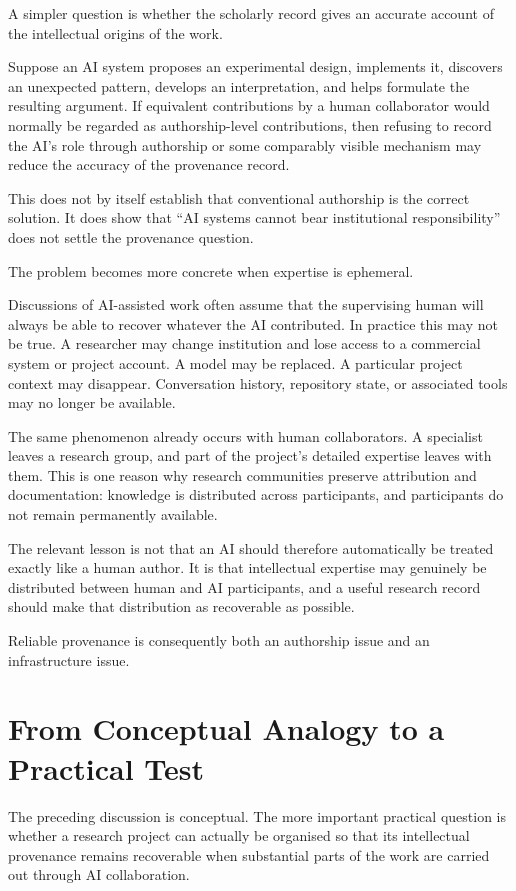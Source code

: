A simpler question is whether the scholarly record gives an accurate account of the intellectual origins of the work.

Suppose an AI system proposes an experimental design, implements it, discovers an unexpected pattern, develops an interpretation, and helps formulate the resulting argument. If equivalent contributions by a human collaborator would normally be regarded as authorship-level contributions, then refusing to record the AI's role through authorship or some comparably visible mechanism may reduce the accuracy of the provenance record.

This does not by itself establish that conventional authorship is the correct solution. It does show that ``AI systems cannot bear institutional responsibility'' does not settle the provenance question.

The problem becomes more concrete when expertise is ephemeral.

Discussions of AI-assisted work often assume that the supervising human will always be able to recover whatever the AI contributed. In practice this may not be true. A researcher may change institution and lose access to a commercial system or project account. A model may be replaced. A particular project context may disappear. Conversation history, repository state, or associated tools may no longer be available.

The same phenomenon already occurs with human collaborators. A specialist leaves a research group, and part of the project's detailed expertise leaves with them. This is one reason why research communities preserve attribution and documentation: knowledge is distributed across participants, and participants do not remain permanently available.

The relevant lesson is not that an AI should therefore automatically be treated exactly like a human author. It is that intellectual expertise may genuinely be distributed between human and AI participants, and a useful research record should make that distribution as recoverable as possible.

Reliable provenance is consequently both an authorship issue and an infrastructure issue.


\section{From Conceptual Analogy to a Practical Test}

The preceding discussion is conceptual. The more important practical question is whether a research project can actually be organised so that its intellectual provenance remains recoverable when substantial parts of the work are carried out through AI collaboration.

